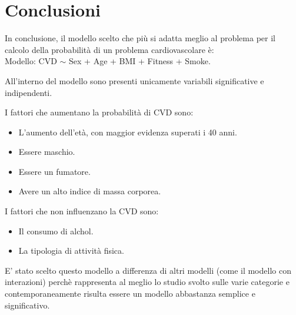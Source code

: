 \documentclass{article}\usepackage[]{graphicx}\usepackage[]{xcolor}
\begin{document}
\section{Conclusioni}
  In conclusione, il modello scelto che più si adatta meglio al problema per il 
  calcolo della probabilità di un problema cardiovascolare è:\\
  Modello: CVD $\sim$ Sex + Age + BMI + Fitness + Smoke. \par
  All'interno del modello sono presenti unicamente variabili significative e
  indipendenti.\par
  I fattori che aumentano la probabilità di CVD sono:
  \begin{itemize}
    \item L'aumento dell'età, con maggior evidenza superati i 40 anni.
    \item Essere maschio.
    \item Essere un fumatore.
    \item Avere un alto indice di massa corporea.
  \end{itemize}
  I fattori che non influenzano la CVD sono:
  \begin{itemize}
    \item Il consumo di alchol.
    \item La tipologia di attività fisica.
  \end{itemize}
  E' stato scelto questo modello a differenza di altri modelli (come il modello 
  con interazioni) perchè rappresenta al meglio lo studio svolto sulle varie
  categorie e contemporaneamente risulta essere un modello abbastanza semplice e
  significativo.
         
\end{document}
